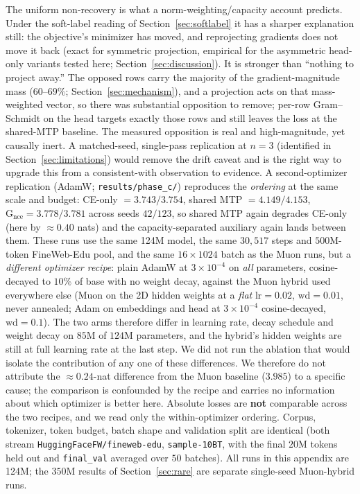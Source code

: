 The uniform non-recovery is what a norm-weighting/capacity account predicts. Under the soft-label reading of Section~\ref{sec:softlabel} it has a sharper explanation still: the objective's minimizer has moved, and reprojecting gradients does not move it back (exact for symmetric projection, empirical for the asymmetric head-only variants tested here; Section~\ref{sec:discussion}). It
is stronger than
``nothing to project away.'' The opposed rows carry the majority of the
gradient-magnitude mass ($60$--$69\%$; Section~\ref{sec:mechanism}), and a
projection acts on that mass-weighted vector, so there was substantial opposition
to remove; per-row Gram--Schmidt on the head targets exactly those rows and still
leaves the loss at the shared-MTP baseline. The measured opposition is
real and high-magnitude, yet causally inert. A matched-seed,
single-pass replication at $n{=}3$ (identified in Section~\ref{sec:limitations})
would remove the drift caveat and is the right way to upgrade this from a
consistent-with observation to evidence. A second-optimizer replication (AdamW; \texttt{results/phase\_c/}) reproduces the
\emph{ordering} at the same scale and budget: CE-only $=3.743/3.754$, shared MTP
$=4.149/4.153$, $\text{G}_\text{nce}=3.778/3.781$ across seeds $42/123$, so shared
MTP again degrades CE-only (here by ${\approx}0.40$ nats) and the
capacity-separated auxiliary again lands between them. These runs use the same
124M model, the same $30{,}517$ steps and $500$M-token FineWeb-Edu pool, and the
same $16 \times 1024$ batch as the Muon runs, but a \emph{different optimizer
recipe}: plain AdamW at $3 \times 10^{-4}$ on \emph{all} parameters, cosine-decayed
to $10\%$ of base with no weight decay, against the Muon hybrid used everywhere else
(Muon on the 2D hidden weights at a \emph{flat} $\mathrm{lr}{=}0.02$, $\mathrm{wd}{=}0.01$,
never annealed; Adam on embeddings and head at $3 \times 10^{-4}$ cosine-decayed,
$\mathrm{wd}{=}0.1$). The two arms therefore differ in learning rate, decay schedule and weight decay on
$85$M of $124$M parameters, and the hybrid's hidden weights are still at full
learning rate at the last step. We did not run the ablation that would isolate the contribution of any one of these differences. We therefore do not attribute the ${\approx}0.24$-nat difference from the Muon baseline ($3.985$) to a specific cause; the comparison is confounded by the recipe and carries no information about which optimizer is better here. Absolute losses are \textbf{not}
comparable across the two recipes, and we read only the within-optimizer ordering. Corpus, tokenizer, token budget, batch shape and validation split are
identical (both stream \texttt{HuggingFaceFW/fineweb-edu}, \texttt{sample-10BT}, with
the final $20$M tokens held out and \texttt{final\_val} averaged over $50$ batches). All runs in this appendix are 124M; the $350$M results
of Section~\ref{sec:rare} are separate single-seed Muon-hybrid runs.

